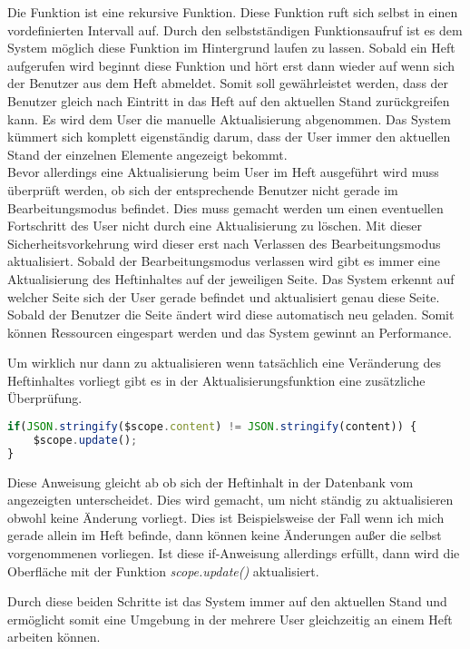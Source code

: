 \newpage

Die Funktion ist eine rekursive Funktion. Diese Funktion ruft sich selbst in einen vordefinierten Intervall auf. Durch den selbstständigen Funktionsaufruf ist es dem System möglich diese Funktion im Hintergrund laufen zu lassen. Sobald ein Heft aufgerufen wird beginnt diese Funktion und hört erst dann wieder auf wenn sich der Benutzer aus dem Heft abmeldet. Somit soll gewährleistet werden, dass der Benutzer gleich nach Eintritt in das Heft auf den aktuellen Stand zurückgreifen kann. Es wird dem User die manuelle Aktualisierung abgenommen. Das System kümmert sich komplett eigenständig darum, dass der User immer den aktuellen Stand der einzelnen Elemente angezeigt bekommt. \\
Bevor allerdings eine Aktualisierung beim User im Heft ausgeführt wird muss überprüft werden, ob sich der entsprechende Benutzer nicht gerade im Bearbeitungsmodus befindet. Dies muss gemacht werden um einen eventuellen Fortschritt des User nicht durch eine Aktualisierung zu löschen. Mit dieser Sicherheitsvorkehrung wird dieser erst nach Verlassen des Bearbeitungsmodus aktualisiert. Sobald der Bearbeitungsmodus verlassen wird gibt es immer eine Aktualisierung des Heftinhaltes auf der jeweiligen Seite. Das System erkennt auf welcher Seite sich der User gerade befindet und aktualisiert genau diese Seite. Sobald der Benutzer die Seite ändert wird diese automatisch neu geladen. Somit können Ressourcen eingespart werden und das System gewinnt an Performance.

Um wirklich nur dann zu aktualisieren wenn tatsächlich eine Veränderung des Heftinhaltes vorliegt gibt es in der Aktualisierungsfunktion eine zusätzliche Überprüfung. 
\begin{lstlisting}[caption={Synchronisation - PWS}, language=Javascript]
if(JSON.stringify($scope.content) != JSON.stringify(content)) {
	$scope.update();
}
\end{lstlisting}
Diese Anweisung gleicht ab ob sich der Heftinhalt in der Datenbank vom angezeigten unterscheidet. Dies wird gemacht, um nicht ständig zu aktualisieren obwohl keine Änderung vorliegt. Dies ist Beispielsweise der Fall wenn ich mich gerade allein im Heft befinde, dann können keine Änderungen außer die selbst vorgenommenen vorliegen. Ist diese if-Anweisung allerdings erfüllt, dann wird die Oberfläche mit der Funktion \textit{scope.update()} aktualisiert.

Durch diese beiden Schritte ist das System immer auf den aktuellen Stand und ermöglicht somit eine Umgebung in der mehrere User gleichzeitig an einem Heft arbeiten können.


